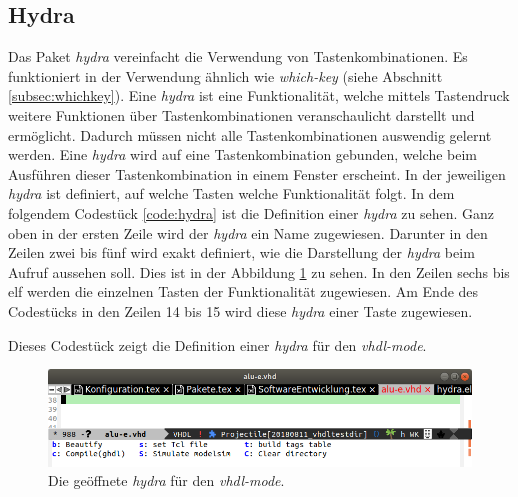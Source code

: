 \subsection{Hydra}
\label{subsec:hydra}
Das Paket \textit{hydra} vereinfacht die Verwendung von
Tastenkombinationen. Es funktioniert in der Verwendung ähnlich wie
\textit{which-key} (siehe Abschnitt \ref{subsec:whichkey}). Eine
\textit{hydra} ist eine Funktionalität, welche mittels Tastendruck
weitere Funktionen über Tastenkombinationen veranschaulicht darstellt
und ermöglicht. Dadurch müssen nicht alle Tastenkombinationen
auswendig gelernt werden. Eine \textit{hydra} wird auf eine
Tastenkombination gebunden, welche beim Ausführen dieser
Tastenkombination in einem Fenster erscheint. In der jeweiligen
\textit{hydra} ist definiert, auf welche Tasten welche Funktionalität
folgt. In dem folgendem Codestück \ref{code:hydra} ist die Definition
einer \textit{hydra} zu sehen. Ganz oben in der ersten Zeile wird der
\textit{hydra} ein Name zugewiesen. Darunter in den Zeilen zwei bis
fünf wird exakt definiert, wie die Darstellung der \textit{hydra} beim
Aufruf aussehen soll. Dies ist in der Abbildung \ref{fig:hydra} zu
sehen. In den Zeilen sechs bis elf werden die einzelnen Tasten der
Funktionalität zugewiesen. Am Ende des Codestücks in den Zeilen 14 bis
15 wird diese \textit{hydra} einer Taste zugewiesen. \cite{Hydra}\\

\begin{program}[h]
  
  \caption{\label{code:hydra}Dieses Codestück zeigt die Definition
    einer \textit{hydra} für den \textit{vhdl-mode}.}
\end{program}

\begin{figure}[h]
  \centering
  \includegraphics[width=.95\textwidth]{./images/Pakete/hydra.png}
  \caption{\label{fig:hydra} Die geöffnete \textit{hydra} für den
    \textit{vhdl-mode}.}
\end{figure}

